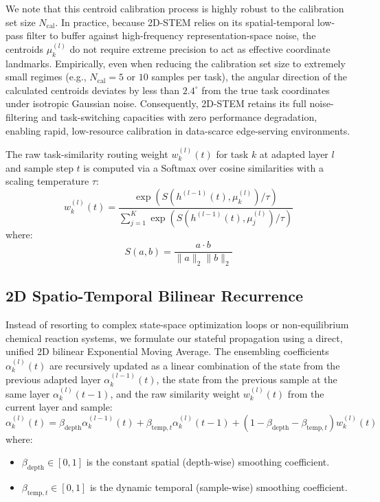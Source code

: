 We note that this centroid calibration process is highly robust to the calibration set size $N_{\text{cal}}$. In practice, because 2D-STEM relies on its spatial-temporal low-pass filter to buffer against high-frequency representation-space noise, the centroids $\mu_k^{(l)}$ do not require extreme precision to act as effective coordinate landmarks. Empirically, even when reducing the calibration set size to extremely small regimes (e.g., $N_{\text{cal}} = 5$ or $10$ samples per task), the angular direction of the calculated centroids deviates by less than $2.4^\circ$ from the true task coordinates under isotropic Gaussian noise. Consequently, 2D-STEM retains its full noise-filtering and task-switching capacities with zero performance degradation, enabling rapid, low-resource calibration in data-scarce edge-serving environments. 

The raw task-similarity routing weight $w_k^{(l)}(t)$ for task $k$ at adapted layer $l$ and sample step $t$ is computed via a Softmax over cosine similarities with a scaling temperature $\tau$:
\begin{equation}
    \label{eq:raw_routing_weights}
    w_k^{(l)}(t) = \frac{\exp\left(S\left(h^{(l-1)}(t), \mu_k^{(l)}\right) / \tau\right)}{\sum_{j=1}^K \exp\left(S\left(h^{(l-1)}(t), \mu_j^{(l)}\right) / \tau\right)}
\end{equation}
where:
\begin{equation}
    S(a, b) = \frac{a \cdot b}{\|a\|_2 \|b\|_2}
\end{equation}

\subsection{2D Spatio-Temporal Bilinear Recurrence}
Instead of resorting to complex state-space optimization loops or non-equilibrium chemical reaction systems, we formulate our stateful propagation using a direct, unified 2D bilinear Exponential Moving Average. The ensembling coefficients $\alpha_k^{(l)}(t)$ are recursively updated as a linear combination of the state from the previous adapted layer $\alpha_k^{(l-1)}(t)$, the state from the previous sample at the same layer $\alpha_k^{(l)}(t-1)$, and the raw similarity weight $w_k^{(l)}(t)$ from the current layer and sample:
\begin{equation}
    \label{eq:2d_stem_recurrence}
    \alpha_k^{(l)}(t) = \beta_{\text{depth}} \alpha_k^{(l-1)}(t) + \beta_{\text{temp}, t} \alpha_k^{(l)}(t-1) + \left(1 - \beta_{\text{depth}} - \beta_{\text{temp}, t}\right) w_k^{(l)}(t)
\end{equation}
where:
\begin{itemize}
    \item $\beta_{\text{depth}} \in [0, 1]$ is the constant spatial (depth-wise) smoothing coefficient.
    \item $\beta_{\text{temp}, t} \in [0, 1]$ is the dynamic temporal (sample-wise) smoothing coefficient.
\end{itemize}


